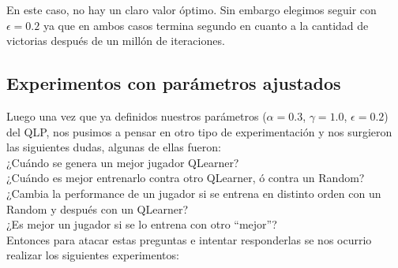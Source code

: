 \documentclass[10pt, a4paper]{article}
\begin{document}
En este caso, no hay un claro valor óptimo. Sin embargo elegimos seguir con $\epsilon=0.2$ ya que en ambos casos termina segundo en cuanto a la cantidad de victorias después de un millón de iteraciones.

\subsection{Experimentos con parámetros ajustados}

Luego una vez que ya definidos nuestros parámetros ($\alpha=0.3$, $\gamma=1.0$, $\epsilon=0.2$) del QLP, nos pusimos a pensar en otro tipo de experimentación y nos surgieron las siguientes dudas, algunas de ellas fueron:\\
¿Cuándo se genera un mejor jugador QLearner? \\
¿Cuándo es mejor entrenarlo contra otro QLearner, ó contra un Random? \\
¿Cambia la performance de un jugador si se entrena en distinto orden con un Random y después con un QLearner?\\
¿Es mejor un jugador si se lo entrena con otro ``mejor''?\\

Entonces para atacar estas preguntas e intentar responderlas se nos ocurrio realizar los siguientes experimentos:
\end{document}

